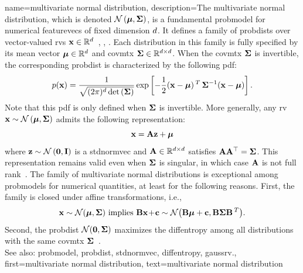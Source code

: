 	
{name={multivariate normal distribution}, 
	description={The multivariate normal distribution, 
		which is denoted $\mathcal{N}\left({\bm \mu},{\bf \Sigma}\right)$, is a fundamental 
		\gls{probmodel} for numerical \glspl{featurevec} of fixed dimension $d$. 
		It defines a family of \glspl{probdist} over \gls{vector}-valued \glspl{rv} 
		${\bf x} \in \mathbb{R}^{d}$~\cite{BertsekasProb}, \cite{GrayProbBook}, \cite{Lapidoth09}. 
		Each distribution in this family is fully specified by its \gls{mean} \gls{vector} 
		${\bm \mu} \in \mathbb{R}^{d}$ and \gls{covmtx} 
		${\bf \Sigma} \in \mathbb{R}^{d \times d}$. When the 
		\gls{covmtx} ${\bf \Sigma}$ is invertible, the corresponding \gls{probdist} is 
		characterized by the following \gls{pdf}:
		\[p({\bf x}) = 
 		\frac{1}{\sqrt{(2\pi)^{d} \det\,({\bf \Sigma})}} 
 		\exp\left[ -\frac{1}{2} 
 		({\bf x} - {\bm \mu})\,^{T}\, {\bf \Sigma}^{-1} 
 		({\bf x} - {\bm \mu}) \right].
 		\]
		Note that this \gls{pdf} is only defined when ${\bf \Sigma}$ is invertible.
   		More generally, any \gls{rv} ${\bf x} \sim \mathcal{N}\left({\bm \mu},{\bf \Sigma}\right)$ 
   		admits the following representation:
  		\[
    		{\bf x} = {\bf A} {\bf z} + {\bm \mu}
   		\]
   		where ${\bf z} \sim \mathcal{N}\left(\mathbf{0},\mathbf{I}\right)$ is a \gls{stdnormvec} 
   		and ${\bf A} \in \mathbb{R}^{d \times d}$ satisfies ${\bf A} {\bf A}^\top = {\bf \Sigma}$. 
   		This representation remains valid even when ${\bf \Sigma}$ is singular, in which case ${\bf A}$ 
   		is not full rank~\cite[Ch. 23]{Lapidoth2017}.
   		The family of multivariate normal distributions is exceptional among \glspl{probmodel} for numerical 
   		quantities, at least for the following reasons. First, the family is closed under affine 
   		transformations, i.e.,
		\[ 
		{\bf x} \sim \mathcal{N}({\bm \mu},{\bf \Sigma}) \mbox{ implies } 
		{\bf B}{\bf x}\!+\!{\bf c} \sim \mathcal{N}\big( {\bf B}{\bm \mu}+{\bf c},{\bf B} {\bf \Sigma} {\bf B}\,^{T} \big). 
		\]
		Second, the \gls{probdist} $\mathcal{N}(\mathbf{0},{\bf \Sigma})$ maximizes the 
		\gls{diffentropy} among all distributions with the same \gls{covmtx} ${\bf \Sigma}$~\cite{coverthomas}. 
		\\ 
		See also: \gls{probmodel}, \gls{probdist}, \gls{stdnormvec}, \gls{diffentropy}, \gls{gaussrv}.}, 
	first={multivariate normal distribution},
	text={multivariate normal distribution}
}


